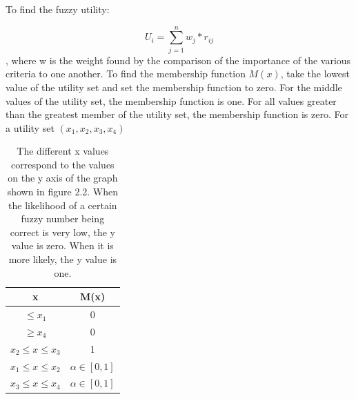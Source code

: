 To find the fuzzy utility:

\begin{equation}
U_i=\sum_{j=1}^n w_j*r_{ij}
\end{equation}, where w is the weight found by the comparison of the importance of the various criteria to one another. To find the membership function $M(x)$, take the lowest value of the utility set and set the membership function to zero.  For the middle values of the utility set, the membership function is one. For all values greater than the greatest member of the utility set, the membership function is zero. For a utility set $(x_1,x_2,x_3,x_4)$

\begin{center}
\begin{table}
\centering
\begin{tabular}{ |c|c| }
 \hline
 x & M(x)\\
 \hline
 $\leq x_1$  & 0 \\
 $\geq x_4$ & 0  \\
 $x_2 \leq x \leq x_3$ & 1  \\
 $x_1 \leq x \leq x_2$ & $\alpha \in [0,1]$\\
 $x_3 \leq x \leq x_4$ & $\alpha \in [0,1]$\\
 \hline

\end{tabular}
 \caption{The different x values correspond to the values on the y axis of the graph shown in figure 2.2.  When the likelihood of a certain fuzzy number being correct is very low, the y value is zero.  When it is more likely, the y value is one.}
 \label{fuzzyfit}
\end{table}
\end{center}

